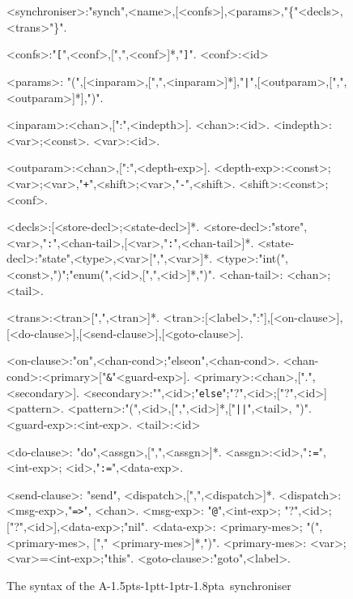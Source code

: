 \documentclass[11pt]{report}
\def\ak{{\textsf{A\kern-1.5pts\kern-1ptt\kern-1ptr\kern-1.8pta}}\kern-2pt{\it K\kern-2ptahn}}
\begin{document}
\begin{figure}
\begin{framed}
\small
\begin{grammar}
[(colon){}]
[(semicolon)]
[(comma){}]
[(period){\\}]
[(quote){\begin{bf}}{\end{bf}}]
[(nonterminal){}{}]
<synchroniser>:"synch",<name>,[<confs>],<params>,"\{"<decls>,<trans>"\}".

<confs>:"{\tt [}",<conf>,[",",<conf>]*,"{\tt ]}".
<conf>:<id>

<params>: "(",[<inparam>,[",",<inparam>]*],"{\tt |}",[<outparam>,[",",<outparam>]*],")".

<inparam>:<chan>,[":",<indepth>].
<chan>:<id>.
<indepth>:<var>;<const>.
<var>:<id>.

<outparam>:<chan>,[":",<depth-exp>].
<depth-exp>:<const>;<var>;<var>,"{\tt+}",<shift>;<var>,"{\tt -}",<shift>.
<shift>:<const>;<conf>.

<decls>:[<store-decl>;<state-decl>]*.
<store-decl>:"store",<var>,"{\tt :}",<chan-tail>,[<var>,"{\tt :}",<chan-tail>]*.
<state-decl>:"state",<type>,<var>[",",<var>]*.
<type>:"int(",<const>,")";"enum(",<id>,[",",<id>]*,")".
<chan-tail>: <chan>;<tail>.

<trans>:<tran>[",",<tran>]*.
<tran>:[<label>,":"],[<on-clause>],[<do-clause>],[<send-clause>],[<goto-clause>].

<on-clause>:"on",<chan-cond>;"elseon",<chan-cond>.
<chan-cond>:<primary>["{\tt \&}"<guard-exp>].
<primary>:<chan>,[".",<secondary>].
<secondary>:"{\tt@}",<id>;"{\tt else}";"?",<id>;["?",<id>]<pattern>.
<pattern>:"(",<id>,[",",<id>]*,["{\tt||}",<tail>, ")".
<guard-exp>:<int-exp>.
<tail>:<id>

<do-clause>: "do",<assgn>,[",",<assgn>]*.
<assgn>:<id>,"{\tt :=}",<int-exp>; <id>,"{\tt :=}",<data-exp>.

<send-clause>: "send", <dispatch>,[",",<dispatch>]*.
<dispatch>: <msg-exp>,"{\tt =>}", <chan>.
<msg-exp>: "{\tt @}",<int-exp>; "?",<id>; ["?",<id>],<data-exp>;"nil".
<data-exp>: <primary-mes>; "(",<primary-mes>, ["," <primary-mes>]*,")".
<primary-mes>: <var>;<var>=<int-exp>;"this".
<goto-clause>:"goto",<label>.

\end{grammar}
\end{framed}
\caption{The syntax of the \ak\ synchroniser\label{synch-syntax}}
\end{figure}
\end{document}
